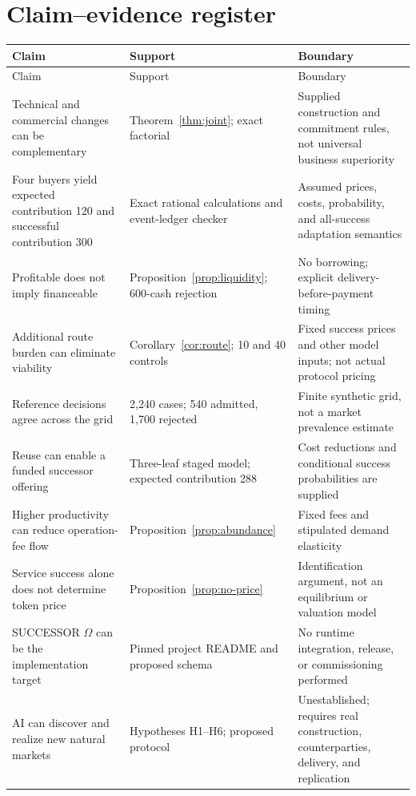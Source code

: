 \documentclass[11pt,letterpaper]{article}
\theoremstyle{remark}\newtheorem{remark}{Remark}[section]
\begin{document}
\section{Claim--evidence register}
\small
\begin{longtable}{@{}P{.29\linewidth}P{.33\linewidth}P{.32\linewidth}@{}}\toprule
Claim & Support & Boundary\\\midrule\endfirsthead
\toprule Claim & Support & Boundary\\\midrule\endhead
Technical and commercial changes can be complementary & Theorem~\ref{thm:joint}; exact factorial & Supplied construction and commitment rules, not universal business superiority\\
Four buyers yield expected contribution 120 and successful contribution 300 & Exact rational calculations and event-ledger checker & Assumed prices, costs, probability, and all-success adaptation semantics\\
Profitable does not imply financeable & Proposition~\ref{prop:liquidity}; 600-cash rejection & No borrowing; explicit delivery-before-payment timing\\
Additional route burden can eliminate viability & Corollary~\ref{cor:route}; 10 and 40 controls & Fixed success prices and other model inputs; not actual protocol pricing\\
Reference decisions agree across the grid & 2,240 cases; 540 admitted, 1,700 rejected & Finite synthetic grid, not a market prevalence estimate\\
Reuse can enable a funded successor offering & Three-leaf staged model; expected contribution 288 & Cost reductions and conditional success probabilities are supplied\\
Higher productivity can reduce operation-fee flow & Proposition~\ref{prop:abundance} & Fixed fees and stipulated demand elasticity\\
Service success alone does not determine token price & Proposition~\ref{prop:no-price} & Identification argument, not an equilibrium or valuation model\\
SUCCESSOR $\Omega$ can be the implementation target & Pinned project README and proposed schema & No runtime integration, release, or commissioning performed\\
AI can discover and realize new natural markets & Hypotheses H1--H6; proposed protocol & Unestablished; requires real construction, counterparties, delivery, and replication\\
\bottomrule
\end{longtable}
\normalsize
\end{document}
